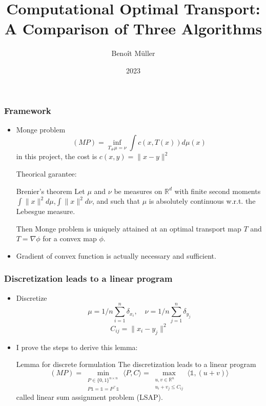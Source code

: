 \documentclass{beamer}
\title{Computational Optimal Transport:\\ A Comparison of Three Algorithms}
\author{Benoît Müller}
\institute{intermediate presentation}
\date{2023}
\newcommand{\R}{\mathbb{R}}
\newcommand{\un}{\mathds{1}}
\newcommand{\ps}[2]{\langle#1,#2\rangle}
\begin{document}
\frame{\titlepage}

\begin{frame}
    \frametitle{Framework}
    \begin{itemize}
    \item Monge problem
    $$(MP) = \inf_{T_{\#}\mu=\nu} \int c(x,T(x)) d\mu(x)$$
    in this project, the cost is $c(x,y)=\|x-y\|^2$
    
    Theorical garantee:
    \begin{alertblock}{Brenier's theorem}
    Let $\mu$ and $\nu$ be measures on $\R^d$ with finite second moments $\int\|x\|^2d\mu$,$\int\|x\|^2d\nu$, and such that $\mu$ is absolutely continuous w.r.t. the Lebesgue measure.
    
    Then Monge problem is uniquely attained at an optimal transport map $T$ and $T=\nabla\phi$ for a convex map $\phi$.
    \end{alertblock}
    \item Gradient of convex function is actually necessary and sufficient.
    \end{itemize}
\end{frame}

\begin{frame}
    \frametitle{Discretization leads to a linear program}
    \begin{itemize}
    \item Discretize $$\mu = 1/n\sum^n_{i=1} \delta_{x_i},\quad\nu = 1/n\sum^n_{j=1} \delta_{y_j}$$
    $$C_{ij} = \|x_i-y_j\|^2$$
    \item I prove the steps to derive this lemma:
    \begin{alertblock}{Lemma for discrete formulation}
    The discretization leads to a linear program 
    $$(MP) 
    = \min_{\substack{P\in\{0,1\}^{n\times n} \\ P\un=\un=P^\top\un}} \ps{P}{C}  
    = \max_{\substack{u,v\in\R^n \\ u_i+v_j\leq C_{ij}}} \ps{\un}{(u+v)}$$
    called linear sum assignment problem (LSAP).
    \end{alertblock}
    \end{itemize}
\end{frame}
\end{document}
